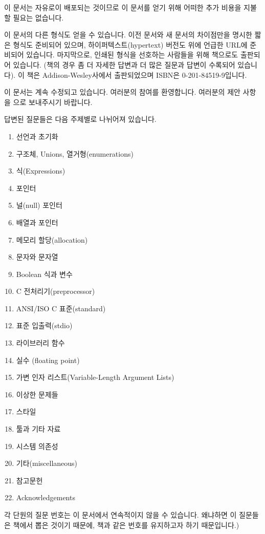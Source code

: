 이 문서는 자유로이 배포되는 것이므로 이 문서를 얻기 위해 어떠한 추가 비용을
지불할 필요는 없습니다.

이 문서의 다른 형식도 얻을 수 있습니다.  이전 문서와 새 문서의 차이점만을
명시한 짧은 형식도 준비되어 있으며, 하이퍼텍스트(hypertext) 버전도
위에 언급한 URL에 준비되어 있습니다.  마지막으로, 인쇄된 형식을 선호하는
사람들을 위해 책으로도 출판되어 있습니다.  (책의 경우 좀 더 자세한 답변과
더 많은 질문과 답변이 수록되어 있습니다).  이 책은 Addison-Wesley사에서
출판되었으며 ISBN은 0-201-84519-9입니다.

이 문서는 계속 수정되고 있습니다.  여러분의 참여를 환영합니다.  여러분의
제안 사항을 으로 보내주시기 바랍니다.

답변된 질문들은 다음 주제별로 나뉘어져 있습니다.

\begin{enumerate}
\item 선언과 초기화
\item 구조체, Unions, 열거형(enumerations)
\item 식(Expressions)
\item 포인터
\item 널(null) 포인터
\item 배열과 포인터
\item 메모리 할당(allocation)
\item 문자와 문자열
\item Boolean 식과 변수
\item C 전처리기(preprocessor)
\item ANSI/ISO C 표준(standard)
\item 표준 입출력(stdio)
\item 라이브러리 함수
\item 실수 (floating point)
\item 가변 인자 리스트(Variable-Length Argument Lists)
\item 이상한 문제들
\item 스타일
\item 툴과 기타 자료
\item 시스템 의존성
\item 기타(miscellaneous)
\item 참고문헌
\item Acknowledgements
\end{enumerate}

각 단원의 질문 번호는 이 문서에서 연속적이지 않을 수 있습니다.
왜냐하면 이 질문들은 책에서 뽑은 것이기 때문에, 책과 같은 번호를
유지하고자 하기 때문입니다.)


